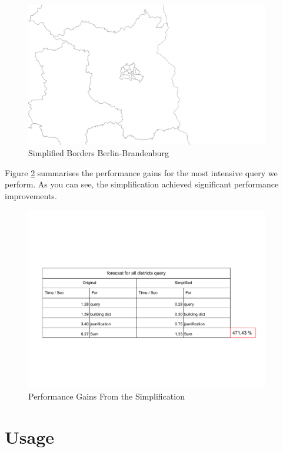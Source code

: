 \documentclass[paper=a4, fontsize=11pt]{scrartcl} %
\numberwithin{equation}{section} %
\numberwithin{figure}{section} %
\numberwithin{table}{section} %
\begin{document}
\begin{figure}[htbp]
	\centering
	\includegraphics[trim = 80mm 10mm 200mm 20mm, clip, width=0.95\textwidth]{pictures/borders_simplified}
	\caption{Simplified Borders Berlin-Brandenburg}
	\label{borders_simple}
\end{figure}

Figure \ref{simplification_table} summarises the performance gains for the most intensive query we perform. As you can see, the simplification achieved significant performance improvements.

\begin{figure}[htbp]
	\centering
	\includegraphics[trim = 0mm 0mm 0mm 0mm, clip, width=0.95\textwidth]{pictures/simplification_table}
	\caption{Performance Gains From the Simplification}
	\label{simplification_table}
\end{figure}



\section{Usage}\label{usage}
\end{document}
